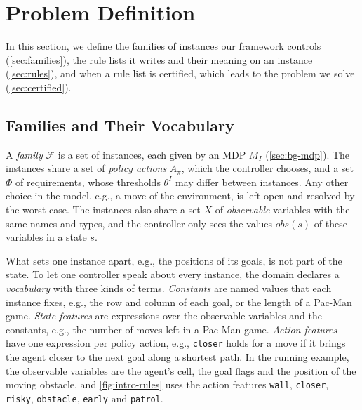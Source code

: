 
\section{Problem Definition}
\label{sec:problem}

In this section, we define the families of instances our framework controls (\autoref{sec:families}), the rule lists it writes and their meaning on an instance (\autoref{sec:rules}), and when a rule list is certified, which leads to the problem we solve (\autoref{sec:certified}).

\subsection{Families and Their Vocabulary}
\label{sec:families}

A \textit{family} $\mathcal{F}$ is a set of instances, each given by an MDP $M_I$ (\autoref{sec:bg-mdp}).
The instances share a set of \textit{policy actions} $A_\pi$, which the controller chooses, and a set $\Phi$ of requirements, whose thresholds $\theta^I$ may differ between instances.
Any other choice in the model, e.g., a move of the environment, is left open and resolved by the worst case.
The instances also share a set $X$ of \textit{observable} variables with the same names and types, and the controller only sees the values $\mathit{obs}(s)$ of these variables in a state $s$.

What sets one instance apart, e.g., the positions of its goals, is not part of the state.
To let one controller speak about every instance, the domain declares a \textit{vocabulary} with three kinds of terms.
\textit{Constants} are named values that each instance fixes, e.g., the row and column of each goal, or the length of a Pac-Man game.
\textit{State features} are expressions over the observable variables and the constants, e.g., the number of moves left in a Pac-Man game.
\textit{Action features} have one expression per policy action, e.g., \texttt{closer} holds for a move if it brings the agent closer to the next goal along a shortest path.
In the running example, the observable variables are the agent's cell, the goal flags and the position of the moving obstacle, and \autoref{fig:intro-rules} uses the action features \texttt{wall}, \texttt{closer}, \texttt{risky}, \texttt{obstacle}, \texttt{early} and \texttt{patrol}.
